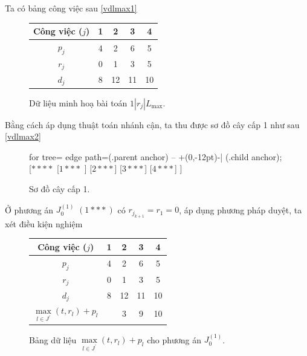 























\begin{vd}
Ta có bảng công việc sau \eqref{vdlmax1}

\begin{figure}[h!]
	\centering
	\begin{tabular}{|c | c c c c |} 
	\hline
	Công việc ($j$) & 1 & 2 & 3 & 4 \\
	\hline\hline
	$p_j$ & 4 & 2 & 6 & 5 \\
	$r_j$ & 0 & 1 & 3 & 5 \\
	$d_j$ & 8 & 12 & 11 & 10 \\
	\hline
	\end{tabular}
\caption{\label{vdlmax1} Dữ liệu minh hoạ bài toán $1 | r_j | L_{\max}$.}
\end{figure}

Bằng cách áp dụng thuật toán nhánh cận, ta thu được sơ đồ cây cấp 1 như sau \eqref{vdlmax2}


\begin{figure}[h!]
	\centering
	\begin{forest} for tree={
		edge path={\noexpand{} (.parent anchor) -- +(0,-12pt)-| (.child anchor);}
	}
	[{$****$}
		[$1***$
		]
		[$2***$]
		[$3***$]
		[$4***$]
	]
	\end{forest}
\caption{\label{vdlmax2} Sơ đồ cây cấp 1.}
\end{figure}

Ở phương án $J_0^{(1)}$ $(1***)$ có $r_{j_{k+1}} = r_1 = 0$, áp dụng phương pháp duyệt, ta xét điều kiện nghiệm

\begin{figure}[h!]
	\centering
	\begin{tabular}{|c | c c c c |} 
	\hline
	Công việc ($j$) & 1 & 2 & 3 & 4 \\
	\hline\hline
	$p_j$ & 4 & 2 & 6 & 5 \\
	$r_j$ & 0 & 1 & 3 & 5 \\
	$d_j$ & 8 & 12 & 11 & 10 \\
	$\underset{l \in J^{'}}{\max} (t, r_l) + p_l$ & & 3 & 9 & 10 \\ 
	\hline
	\end{tabular}
\caption{\label{vdlmax00} Bảng dữ liệu $\underset{l \in J^{'}}{\max} (t, r_l) + p_l$ cho phương án $J_0^{(1)}$.}
\end{figure}


\end{vd}
